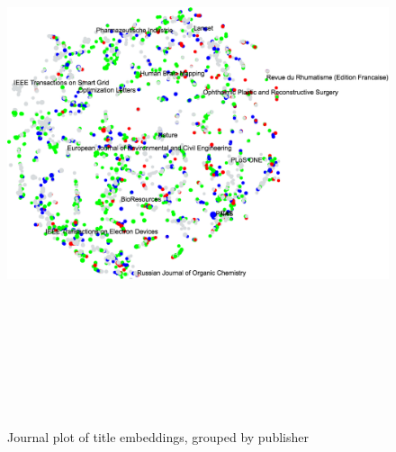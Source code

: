\documentclass[../../Thesis.tex]{subfiles}
\begin{document}
\begin{landscape}
\begin{figure}
\begin{center}
\includegraphics[height=6.5in]{Plots/Journal_Plots/Title_normal}
\end{center}
\caption{Journal plot of title embeddings, grouped by publisher}\label{figure:titlePlotNormal}
\end{figure}
\end{landscape}
\end{document}
